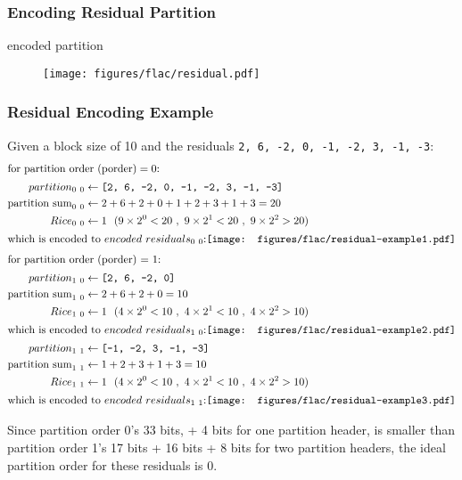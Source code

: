 \subsubsection{Encoding Residual Partition}
\Return encoded partition\;
\EALGORITHM

\begin{figure}[h]
\texttt{[image: figures/flac/residual.pdf]}
\end{figure}

\clearpage

\subsubsection{Residual Encoding Example}
Given a block size of 10 and the residuals \texttt{2, 6, -2, 0, -1, -2, 3, -1, -3}:
\begin{align*}
\intertext{for $\text{partition order (porder)} = 0$:}
partition_{0~0} &\leftarrow \texttt{[2, 6, -2, 0, -1, -2, 3, -1, -3]} \\
\text{partition sum}_{0~0} &\leftarrow 2 + 6 + 2 + 0 + 1 + 2 + 3 + 1 + 3 = 20 \\
Rice_{0~0} &\leftarrow 1~~(9 \times 2 ^ 0 < 20~,~9 \times 2 ^ 1 < 20~,~9 \times 2 ^ 2 > 20) \\
\intertext{which is encoded to $encoded~residuals_{0~0}$:
\newline
\texttt{[image: figures/flac/residual-example1.pdf]}}
\intertext{for partition order (porder) = 1:}
partition_{1~0} &\leftarrow \texttt{[2, 6, -2, 0]} \\
\text{partition sum}_{1~0} &\leftarrow 2 + 6 + 2 + 0 = 10 \\
Rice_{1~0} &\leftarrow 1~~(4 \times 2 ^ 0 < 10~,~4 \times 2 ^ 1 < 10~,~4 \times 2 ^ 2 > 10) \\
\intertext{which is encoded to $encoded~residuals_{1~0}$:
\newline
\texttt{[image: figures/flac/residual-example2.pdf]}}
partition_{1~1} &\leftarrow \texttt{[-1, -2, 3, -1, -3]} \\
\text{partition sum}_{1~1} &\leftarrow 1 + 2 + 3 + 1 + 3 = 10 \\
Rice_{1~1} &\leftarrow 1~~(4 \times 2 ^ 0 < 10~,~4 \times 2 ^ 1 < 10~,~4 \times 2 ^ 2 > 10) \\
\intertext{which is encoded to $encoded~residuals_{1~1}$:
\newline
\texttt{[image: figures/flac/residual-example3.pdf]}}
\end{align*}
\par
\noindent
Since partition order 0's 33 bits, + 4 bits for one partition header,
is smaller than partition order 1's 17 bits + 16 bits + 8 bits
for two partition headers, the ideal partition order for these residuals is 0.

